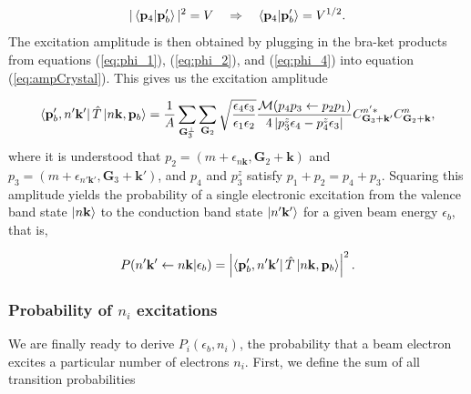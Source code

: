 \documentclass[twoside,twocolumn,9pt]{article}
\begin{document}
\begin{equation} 
  \label{eq:phi_4}
    |\bra{\mathbf{p}_4}\ket{\mathbf{p}_b'}|^2
    =
    V \quad\Rightarrow\quad \bra{\mathbf{p}_4}\ket{\mathbf{p}_b'}
    =
    V^{1/2}.
\end{equation}
%
The excitation amplitude is then obtained by plugging in the bra-ket products from
equations (\ref{eq:phi_1}), (\ref{eq:phi_2}), and (\ref{eq:phi_4}) into
equation (\ref{eq:ampCrystal}). This gives us the excitation amplitude

\begin{equation} 
  \begin{aligned}
      \bra{\mathbf{p}_b', n'\mathbf{k'}} \hat{T} \ket{n\mathbf{k},\mathbf{p}_b}
      =
      \frac{1}{A}
      \sum_{\mathbf{G}_3^\perp} \sum_{\mathbf{G}_2}
      \sqrt{\frac{ \epsilon_4\epsilon_3 }{ \epsilon_1\epsilon_2 }}
      \frac{\mathcal{M}(p_4p_3\leftarrow p_2p_1)}
      {4\left|p_3^z\epsilon_4 - p_4^z\epsilon_3\right|}
      C_{\mathbf{G}_3+\mathbf{k'}}^{n'\ast} C_{\mathbf{G}_2+\mathbf{k}}^{n},
  \end{aligned}
  \label{eq:ampCode} 
\end{equation}
%
where it is understood that $p_2 = (m + \epsilon_{n\mathbf{k}},
\mathbf{G}_2 + \mathbf{k})$ and
$p_3 = (m + \epsilon_{n'\mathbf{k'}}, \mathbf{G}_3 + \mathbf{k'})$,
and $p_4$ and $p_3^z$ satisfy $p_1 + p_2 = p_4 + p_3$.
Squaring this amplitude yields the probability of a single electronic
excitation from the valence band state $\ket{n\mathbf{k}}$ to the conduction
band state $\ket{n'\mathbf{k'}}$ for a given beam energy $\epsilon_b$, that is,

\begin{equation}
  P(n'\mathbf{k'}\leftarrow n\mathbf{k}|\epsilon_b)
  =
  \left|
  \bra{\mathbf{p}_b', n'\mathbf{k'}} \hat{T} \ket{n\mathbf{k},\mathbf{p}_b}
  \right|^2.
  \label{eq:prob}
\end{equation}

\subsubsection{Probability of $n_i$ excitations}
\label{sec:Pi}

We are finally ready to derive $P_i(\epsilon_b, n_i)$, the probability that a
beam electron excites a particular number of electrons $n_i$.  First, we define
the sum of all transition probabilities
\end{document}
